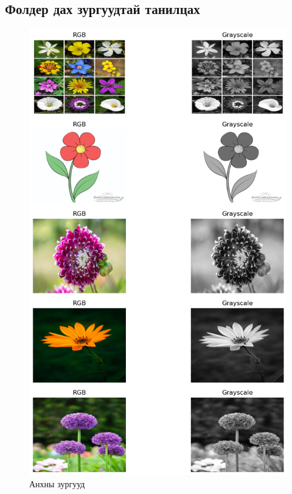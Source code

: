 \documentclass[a4paper]{article}
\begin{document}
\subsection{Фолдер дах зургуудтай танилцах}
\begin{figure}[H]
  \centering
  \includegraphics[scale = 0.5]{img1.png}
  \caption[Caption for Pointer example]{Анхны зургууд}
  \label{fig:example_1}
\end{figure}
\end{document}
